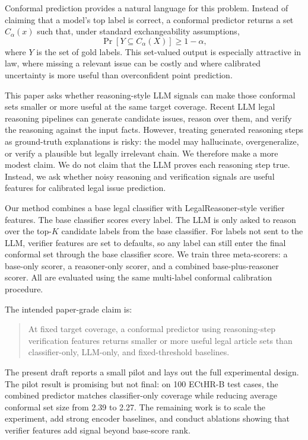 \documentclass[11pt]{article}
\begin{document}
Conformal prediction provides a natural language for this problem. Instead of claiming that a model's top label is correct, a conformal predictor returns a set $C_\alpha(x)$ such that, under standard exchangeability assumptions,
\[
  \Pr[Y \subseteq C_\alpha(X)] \geq 1-\alpha,
\]
where $Y$ is the set of gold labels. This set-valued output is especially attractive in law, where missing a relevant issue can be costly and where calibrated uncertainty is more useful than overconfident point prediction.

This paper asks whether reasoning-style LLM signals can make those conformal sets smaller or more useful at the same target coverage. Recent LLM legal reasoning pipelines can generate candidate issues, reason over them, and verify the reasoning against the input facts. However, treating generated reasoning steps as ground-truth explanations is risky: the model may hallucinate, overgeneralize, or verify a plausible but legally irrelevant chain. We therefore make a more modest claim. We do not claim that the LLM proves each reasoning step true. Instead, we ask whether noisy reasoning and verification signals are useful features for calibrated legal issue prediction.

Our method combines a base legal classifier with LegalReasoner-style verifier features. The base classifier scores every label. The LLM is only asked to reason over the top-$K$ candidate labels from the base classifier. For labels not sent to the LLM, verifier features are set to defaults, so any label can still enter the final conformal set through the base classifier score. We train three meta-scorers: a base-only scorer, a reasoner-only scorer, and a combined base-plus-reasoner scorer. All are evaluated using the same multi-label conformal calibration procedure.

The intended paper-grade claim is:

\begin{quote}
At fixed target coverage, a conformal predictor using reasoning-step verification features returns smaller or more useful legal article sets than classifier-only, LLM-only, and fixed-threshold baselines.
\end{quote}

The present draft reports a small pilot and lays out the full experimental design. The pilot result is promising but not final: on 100 ECtHR-B test cases, the combined predictor matches classifier-only coverage while reducing average conformal set size from 2.39 to 2.27. The remaining work is to scale the experiment, add strong encoder baselines, and conduct ablations showing that verifier features add signal beyond base-score rank.
\end{document}
